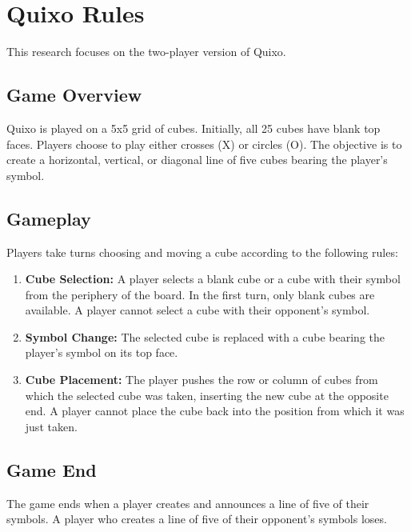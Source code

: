 \section{Quixo Rules} \label{sec:rules}

This research focuses on the two-player version of Quixo.

\subsection{Game Overview}

Quixo is played on a 5x5 grid of cubes.  Initially, all 25 cubes have blank top faces. Players choose to play either crosses (X) or circles (O). The objective is to create a horizontal, vertical, or diagonal line of five cubes bearing the player's symbol.

\subsection{Gameplay}

Players take turns choosing and moving a cube according to the following rules:

\begin{enumerate}
    \item \textbf{Cube Selection:} A player selects a blank cube or a cube with their symbol from the periphery of the board.  In the first turn, only blank cubes are available.  A player cannot select a cube with their opponent's symbol.
    \item \textbf{Symbol Change:} The selected cube is replaced with a cube bearing the player's symbol on its top face.
    \item \textbf{Cube Placement:} The player pushes the row or column of cubes from which the selected cube was taken, inserting the new cube at the opposite end.  A player cannot place the cube back into the position from which it was just taken.
\end{enumerate}

\subsection{Game End}

The game ends when a player creates and announces a line of five of their symbols.  A player who creates a line of five of their opponent's symbols loses.
